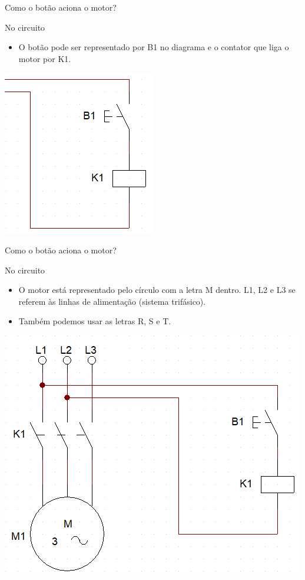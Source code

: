 \begin{frame}{Como o botão aciona o motor?}
\begin{block}{No circuito}
	\begin{itemize}
		\item O botão pode ser representado por B1 no diagrama e o contator que liga o motor por K1.
	\end{itemize}
\end{block}
\centerline{\includegraphics[width=0.4\linewidth]{Figuras/Ch05/fig6.jpg}}
\end{frame}


\begin{frame}{Como o botão aciona o motor?}
\begin{block}{No circuito}
	\begin{itemize}
		\item O motor está representado pelo círculo com a letra M dentro. L1, L2 e  L3 se referem às linhas de alimentação (sistema trifásico). 
		\item Também podemos usar as letras R, S e T.
	\end{itemize}
\end{block}
\centerline{\includegraphics[height=0.6\textheight]{Figuras/Ch05/fig7.jpg}}
\end{frame}


